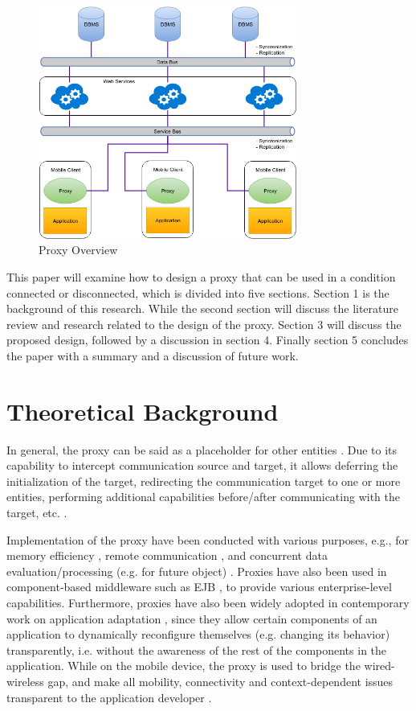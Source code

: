 \documentclass[conference]{IEEEtran}
\begin{document}
\begin{figure}
    \centering
    \includegraphics[width=8.5cm]{../Images/proxy-overview}
    \caption{Proxy Overview}
    \label{fig:proxy-overview}
\end{figure}

This paper will examine how to design a proxy that can be used in a condition connected or disconnected, which is divided into five sections. Section 1 is the background of this research. While the second section will discuss the literature review and research related to the design of the proxy. Section 3 will discuss the proposed design, followed by a discussion in section 4. Finally section 5 concludes the paper with a summary and a discussion of future work.




\section{Theoretical Background}
In general, the proxy can be said as a placeholder for other entities \cite{gamma_design_1995}. Due to its capability to intercept communication source and target, it allows deferring the initialization of the target, redirecting the communication target to one or more entities, performing additional capabilities before/after communicating with the target, etc. \cite{gani_improving_2009}.

Implementation of the proxy have been conducted with various purposes, e.g., for memory efficiency \cite{gamma_design_1995}, remote communication \cite{wilson_get_2000}, and concurrent data evaluation/processing (e.g. for future object) \cite{pratikakis_transparent_2004}. Proxies have also been used in component-based middleware such as EJB \cite{_fusion_????}, to provide various enterprise-level capabilities. Furthermore, proxies have also been widely adopted in contemporary work on application adaptation \cite{holder_system_1999} \cite{philippsen_javaparty_1997} \cite{rubinsztejn_framework_2005} \cite{ryan_application_2004} \cite{tatsubori_bytecode_2001} \cite{tilevich_j-orchestra:_2002}, since they allow certain components of an application to dynamically reconfigure themselves (e.g. changing its behavior) transparently, i.e. without the awareness of the rest of the components in the application. While on the mobile device, the proxy is used to bridge the wired-wireless gap, and make all mobility, connectivity and context-dependent issues transparent to the application developer \cite{rubinsztejn_framework_2005}.
\end{document}
